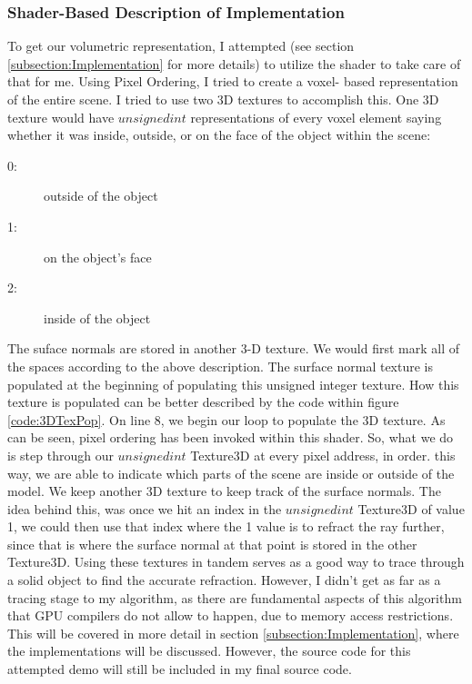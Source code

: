 \documentclass[a4paper, 12pt]{article}
\begin{document}
\subsubsection{Shader-Based Description of Implementation}

To get our volumetric representation, I attempted (see section
\ref{subsection:Implementation} for more details) to utilize the shader to
take care of that for me. Using Pixel Ordering, I tried to create a voxel-
based representation of the entire scene. I tried to use two 3D textures to
accomplish this. One 3D texture would have $unsigned int$ representations of
every voxel element saying whether it was inside, outside, or on the face of
the object within the scene:

\begin{description}
\item[0:] outside of the object
\item[1:] on the object's face
\item[2:] inside of the object
\end{description}

\noindent The suface normals are stored in another 3-D texture. We would first
mark all of the spaces according to the above description. The surface normal
texture is populated at the beginning of populating this unsigned integer
texture. How this texture is populated can be better described by the code
within figure \ref{code:3DTexPop}. On line 8, we begin our loop to populate
the 3D texture. As can be seen, pixel ordering has been invoked within this
shader. So, what we do is step through our $unsigned int$ Texture3D at every
pixel address, in order. this way, we are able to indicate which parts of the
scene are inside or outside of the model. We keep another 3D texture to keep
track of the surface normals. The idea behind this, was once we hit an index
in the $unsigned int$ Texture3D of value 1, we could then use that index where
the 1 value is to refract the ray further, since that is where the surface
normal at that point is stored in the other Texture3D. Using these textures in
tandem serves as a good way to trace through a solid object to find the
accurate refraction. However, I didn't get as far as a tracing stage to my
algorithm, as there are fundamental aspects of this algorithm that GPU
compilers do not allow to happen, due to memory access restrictions. This will
be covered in more detail in section \ref{subsection:Implementation}, where
the implementations will be discussed. However, the source code for this
attempted demo will still be included in my final source code.
\end{document}
